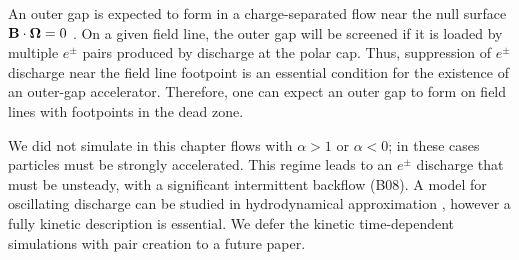 An outer gap is expected to form in a charge-separated flow near the null surface
$\mathbf{B}\cdot\bm{\Omega}=0$
\citep{cheng_energetic_1986}
. On a given field line, the outer gap will be screened if it is loaded by multiple $e^\pm$ pairs
produced by discharge at the polar cap.
Thus, suppression of $e^\pm$ discharge near the field line footpoint is
an essential condition for the existence of an outer-gap accelerator.
Therefore, one can expect an outer gap to form on
field lines with footpoints in the dead zone.


We did not simulate in this chapter flows with $\alpha>1$ or $\alpha<0$;
in these cases particles must be strongly accelerated.
This regime leads to an $e^\pm$ discharge that must be unsteady,
with a significant intermittent backflow (B08).
A model for oscillating discharge can be studied in hydrodynamical approximation
\citep{levinson_large-amplitude_2005}
, however a fully kinetic description is essential.
We defer the kinetic time-dependent simulations with pair creation
to a future paper.


